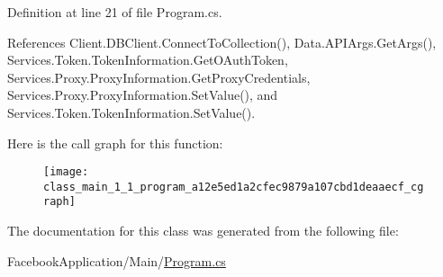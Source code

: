 Definition at line 21 of file Program.\+cs.



References Client.\+D\+B\+Client.\+Connect\+To\+Collection(), Data.\+A\+P\+I\+Args.\+Get\+Args(), Services.\+Token.\+Token\+Information.\+Get\+O\+Auth\+Token, Services.\+Proxy.\+Proxy\+Information.\+Get\+Proxy\+Credentials, Services.\+Proxy.\+Proxy\+Information.\+Set\+Value(), and Services.\+Token.\+Token\+Information.\+Set\+Value().



Here is the call graph for this function\+:
\nopagebreak
\begin{figure}[H]
\begin{center}
\leavevmode
\texttt{[image: class\_main\_1\_1\_program\_a12e5ed1a2cfec9879a107cbd1deaaecf\_cgraph]}
\end{center}
\end{figure}




The documentation for this class was generated from the following file\+:\begin{DoxyCompactItemize}
\item 
Facebook\+Application/\+Main/\hyperlink{_main_2_program_8cs}{Program.\+cs}\end{DoxyCompactItemize}

